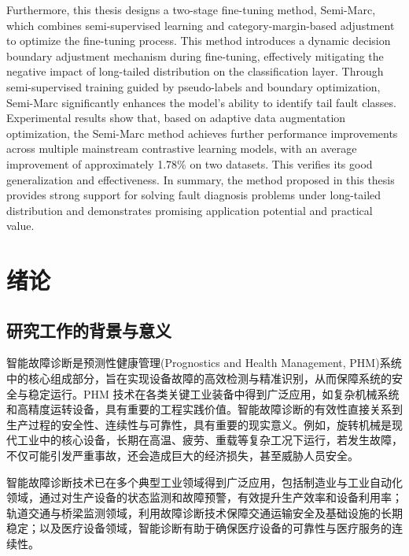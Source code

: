 \documentclass[master]{thesis-uestc}
\begin{document}
\begin{englishabstract}
    Furthermore, this thesis designs a two-stage fine-tuning method, Semi-Marc, which combines semi-supervised learning and category-margin-based adjustment to optimize the fine-tuning process. This method introduces a dynamic decision boundary adjustment mechanism during fine-tuning, effectively mitigating the negative impact of long-tailed distribution on the classification layer. Through semi-supervised training guided by pseudo-labels and boundary optimization, Semi-Marc significantly enhances the model's ability to identify tail fault classes. Experimental results show that, based on adaptive data augmentation optimization, the Semi-Marc method achieves further performance improvements across multiple mainstream contrastive learning models, with an average improvement of approximately 1.78\% on two datasets. This verifies its good generalization and effectiveness. In summary, the method proposed in this thesis provides strong support for solving fault diagnosis problems under long-tailed distribution and demonstrates promising application potential and practical value.


\end{englishabstract}

\thesistableofcontents

\chapter{绪\hspace{6pt}论}

\section{研究工作的背景与意义}

智能故障诊断是预测性健康管理(Prognostics and Health Management, PHM)系统中的核心组成部分，旨在实现设备故障的高效检测与精准识别，从而保障系统的安全与稳定运行。PHM 技术在各类关键工业装备中得到广泛应用，如复杂机械系统和高精度运转设备，具有重要的工程实践价值。智能故障诊断的有效性直接关系到生产过程的安全性、连续性与可靠性，具有重要的现实意义。例如，旋转机械是现代工业中的核心设备，长期在高温、疲劳、重载等复杂工况下运行，若发生故障，不仅可能引发严重事故，还会造成巨大的经济损失，甚至威胁人员安全。

智能故障诊断技术已在多个典型工业领域得到广泛应用，包括制造业与工业自动化领域，通过对生产设备的状态监测和故障预警，有效提升生产效率和设备利用率；轨道交通与桥梁监测领域，利用故障诊断技术保障交通运输安全及基础设施的长期稳定；以及医疗设备领域，智能诊断有助于确保医疗设备的可靠性与医疗服务的连续性。
\end{document}
